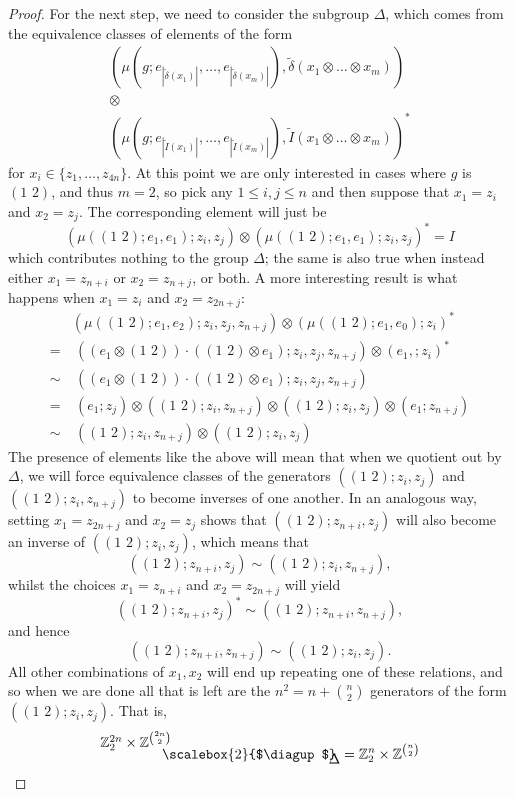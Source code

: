 \documentclass{amsbook} %
\newcommand{\bigquotient}[2]{ \raisebox{0.75\height}{$#1$} \mkern-12mu\scalebox{2}{$\diagup$}\mkern-10mu \raisebox{-0.5\height}{$#2$} }
\newcommand{\trans}[2]{( #1 \, \, #2 )}
\numberwithin{section}{chapter}
\begin{document}
\begin{proof}
For the next step, we need to consider the subgroup $\Delta$, which comes from the equivalence classes of elements of the form
  \[
    \begin{array}{c}
			\left(\mu(g;e_{|\tilde{\delta}(x_1)|}, \ldots, e_{|\tilde{\delta}(x_m)|}),\tilde{\delta}(x_1 \otimes \ldots \otimes x_m) \right) \\
			\otimes \\
			\left(\mu(g;e_{|\tilde{I}(x_1)|}, \ldots, e_{|\tilde{I}(x_m)|}), \tilde{I}(x_1 \otimes \ldots \otimes x_m)\right)^*
  	\end{array} 
  \]
for $x_i \in \{z_1, \ldots, z_{4n} \}$. At this point we are only interested in cases where $g$ is $\trans{1}{2}$, and thus $m=2$, so pick any $1 \le i,j \le n$ and then suppose that $x_1 = z_i$ and $x_2 = z_j$. The corresponding element will just be
  \[
    \left(\mu(\trans{1}{2};e_1, e_1);z_i, z_j\right) \otimes \left( \mu( \trans{1}{2} ; e_1, e_1 ) ; z_i, z_j \right)^* = I
  \]
which contributes nothing to the group $\Delta$; the same is also true when instead either $x_1 = z_{n+i}$ or $x_2 = z_{n+j}$, or both. A more interesting result is what happens when $x_1 = z_i$ and $x_2 = z_{2n+j}$: 
  \begin{align*}
		&\left(\mu(\trans{1}{2};e_1, e_2);z_i , z_j, z_{n+j} \right) \otimes \left(\mu( \trans{1}{2} ; e_1, e_0) ; z_i \right)^* \\
		=&~\left((e_1 \otimes \trans{1}{2}) \cdot (\trans{1}{2} \otimes e_1) ; z_i , z_j, z_{n+j} \right) \otimes \left(e_1, ;z_i \right)^* \\
		\sim&~\left((e_1 \otimes \trans{1}{2}) \cdot (\trans{1}{2} \otimes e_1);z_i , z_j, z_{n+j}\right) \\
		=&~(e_1 ; z_j) \otimes (\trans{1}{2};  z_i, z_{n+j}) \otimes ( \trans{1}{2};  z_i , z_{j}) \otimes (e_1 ;z_{n+j}) \\
		\sim&~(\trans{1}{2};  z_i, z_{n+j}) \otimes (\trans{1}{2};  z_i , z_j)
	\end{align*}
The presence of elements like the above will mean that when we quotient out by $\Delta$, we will force equivalence classes of the generators $(\trans{1}{2};  z_i , z_j )$ and $(\trans{1}{2} ; z_i, z_{n+j})$ to become inverses of one another. In an analogous way, setting $x_1 = z_{2n+j}$ and $x_2 = z_j$ shows that $(\trans{1}{2} ; z_{n+i}, z_j)$ will also become an inverse of $(\trans{1}{2}; z_i , z_j)$, which means that
  \[
    (\trans{1}{2} ; z_{n+i}, z_j) \sim (\trans{1}{2} ; z_i, z_{n+j}),
  \]
 whilst the choices $x_1 = z_{n+i}$ and $x_2 = z_{2n+j}$ will yield
  \[
    (\trans{1}{2} ; z_{n+i}, z_j)^* \sim (\trans{1}{2} ; z_{n+i}, z_{n+j}),
  \]
and hence
  \[
    (\trans{1}{2} ; z_{n+i}, z_{n+j}) \sim (\trans{1}{2} ; z_i, z_j).
  \]
All other combinations of $x_1, x_2$ will end up repeating one of these relations, and so when we are done all that is left are the $n^2 = n + {\binom{n}{2}}$ generators of the form $(\trans{1}{2} ; z_i, z_j)$. That is,
  \[
    \bigquotient{\mathbb{Z}_2^{2n} \times \mathbb{Z}^{\binom{2n}{2}}}{\Delta} = \mathbb{Z}_2^{n} \times \mathbb{Z}^{\binom{n}{2}}
  \]


\end{proof}
\end{document}
